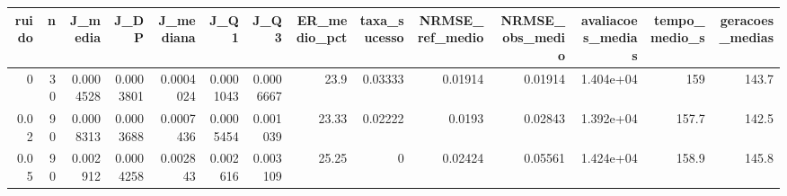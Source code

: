 \begin{tabular}{rrrrrrrrrrrrrr}
\toprule
ruido & n & J\_media & J\_DP & J\_mediana & J\_Q1 & J\_Q3 & ER\_medio\_pct & taxa\_sucesso & NRMSE\_ref\_medio & NRMSE\_obs\_medio & avaliacoes\_medias & tempo\_medio\_s & geracoes\_medias \\
\midrule
0 & 30 & 0.0004528 & 0.0003801 & 0.0004024 & 0.0001043 & 0.0006667 & 23.9 & 0.03333 & 0.01914 & 0.01914 & 1.404e+04 & 159 & 143.7 \\
0.02 & 90 & 0.0008313 & 0.0003688 & 0.0007436 & 0.0005454 & 0.001039 & 23.33 & 0.02222 & 0.0193 & 0.02843 & 1.392e+04 & 157.7 & 142.5 \\
0.05 & 90 & 0.002912 & 0.0004258 & 0.002843 & 0.002616 & 0.003109 & 25.25 & 0 & 0.02424 & 0.05561 & 1.424e+04 & 158.9 & 145.8 \\
\bottomrule
\end{tabular}
